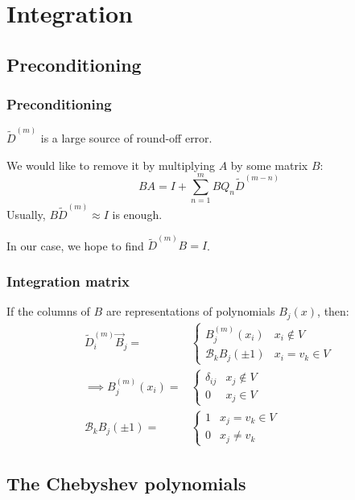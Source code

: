 \documentclass{beamer}
\begin{document}
\section{Integration}

\subsection{Preconditioning}

\begin{frame}
\frametitle{Preconditioning}
$\tilde{D}^{(m)}$ is a large source of round-off error.

We would like to remove it by multiplying $A$ by some matrix $B$:
\begin{equation*}
B A = I + \sum_{n=1}^m B Q_n \tilde{D}^{(m-n)}
\end{equation*}
Usually, $B \tilde{D}^{(m)} \approx I$ is enough.

In our case, we hope to find $\tilde{D}^{(m)} B = I$.
\end{frame}

\begin{frame}
\frametitle{Integration matrix}
If the columns of $B$ are representations of polynomials $B_j(x)$, then:
\begin{align*}
\tilde{D}^{(m)}_i \vec{B}_j = & \begin{cases} B^{(m)}_j(x_i) & x_i \notin V \\ \mathcal{B}_k B_j(\pm 1) & x_i = v_k \in V \end{cases} \\
 \implies B^{(m)}_j(x_i) = & \begin{cases} \delta_{ij} & x_j \notin V \\ 0 & x_j \in V \end{cases} \\
\mathcal{B}_k B_j(\pm 1) = & \begin{cases} 1 & x_j = v_k \in V \\ 0 & x_j \neq v_k \end{cases}
\end{align*}
\end{frame}

\subsection{The Chebyshev polynomials}
\end{document}
